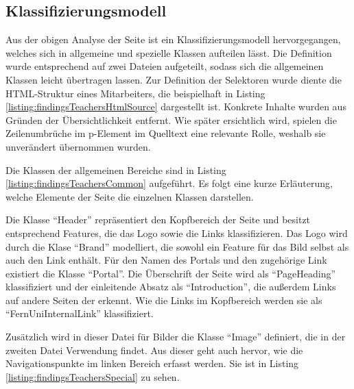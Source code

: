 \subsection{Klassifizierungsmodell}
    Aus der obigen Analyse der Seite ist ein Klassifizierungsmodell hervorgegangen,
    welches sich in allgemeine und spezielle Klassen aufteilen lässt.
    Die Definition wurde entsprechend auf zwei Dateien aufgeteilt,
    sodass sich die allgemeinen Klassen leicht übertragen lassen.
    Zur Definition der Selektoren wurde diente die HTML-Struktur
    eines Mitarbeiters, die beispielhaft in Listing
    \ref{listing:findingsTeachersHtmlSource} dargestellt ist.
    Konkrete Inhalte wurden aus Gründen der Übersichtlichkeit entfernt.
    Wie später ersichtlich wird, spielen die Zeilenumbrüche im p-Element
    im Quelltext eine relevante Rolle, weshalb sie unverändert übernommen wurden.

    

    Die Klassen der allgemeinen Bereiche sind in Listing
    \ref{listing:findingsTeachersCommon} aufgeführt.
    Es folgt eine kurze Erläuterung,
    welche Elemente der Seite die einzelnen Klassen darstellen.

    

    Die Klasse "`Header"' repräsentiert den Kopfbereich der Seite
    und besitzt entsprechend Features,
    die das Logo sowie die Links klassifizieren.
    Das Logo wird durch die Klase "`Brand"' modelliert,
    die sowohl ein Feature für das Bild selbst als auch den Link enthält.
    Für den Namen des Portals und den zugehörige Link existiert die Klasse "`Portal"'.
    Die Überschrift der Seite wird als "`PageHeading"' klassifiziert und
    der einleitende Absatz als "`Introduction"', die außerdem Links auf andere
    Seiten der {\fernUni} erkennt.
    Wie die Links im Kopfbereich werden sie als "`FernUniInternalLink"' klassifiziert.

    Zusätzlich wird in dieser Datei für Bilder die Klasse "`Image"' definiert,
    die in der zweiten Datei Verwendung findet.
    Aus dieser geht auch hervor, wie die Navigationspunkte im linken Bereich erfasst werden.
    Sie ist in Listing \ref{listing:findingsTeachersSpecial} zu sehen.

